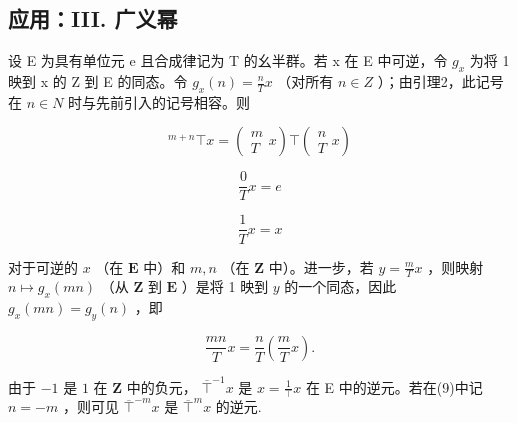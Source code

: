 \subsection{应用：III. 广义幂}

设 E 为具有单位元 e 且合成律记为 T 的幺半群。若 x 在 E 中可逆，令 \(g_{x}\) 为将 1 映到 x 的 Z 到 E 的同态。令 \(g_{x}(n) = \frac{n}{T} x\) （对所有 \(n \in Z\) ）；由引理2，此记号在 \(n \in N\) 时与先前引入的记号相容。则

\[
{ } ^ { m + n } \top x = \left( \begin{array} { c } m \\ T \end{array} x \right) \top \left( \begin{array} { c } n \\ T \end{array} x \right)\tag{9}
\]

\[
\frac {0}{T} x = e\tag{10}
\]

\[
\frac {1}{T} x = x\tag{11}
\]

对于可逆的 \(x\) （在 \(\mathbf{E}\) 中）和 \(m, n\) （在 \(\mathbf{Z}\) 中）。进一步，若 \(y = \frac{m}{T} x\) ，则映射 \(n \mapsto g_x(mn)\) （从 \(\mathbf{Z}\) 到 \(\mathbf{E}\) ）是将 1 映到 \(y\) 的一个同态，因此 \(g_x(mn) = g_y(n)\) ，即

\[
\frac {m n}{T} x = \frac {n}{T} \left(\frac {m}{T} x\right).\tag{12}
\]

由于 \(-1\) 是 \(1\) 在 \(\mathbf{Z}\) 中的负元， \(\overline{\top}^{-1}x\) 是 \(x = \frac{1}{\top} x\) 在 E 中的逆元。若在(9)中记 \(n = -m\) ，则可见 \(\overline{\top}^{-m}x\) 是 \(\overline{\top}^{m}x\) 的逆元.

